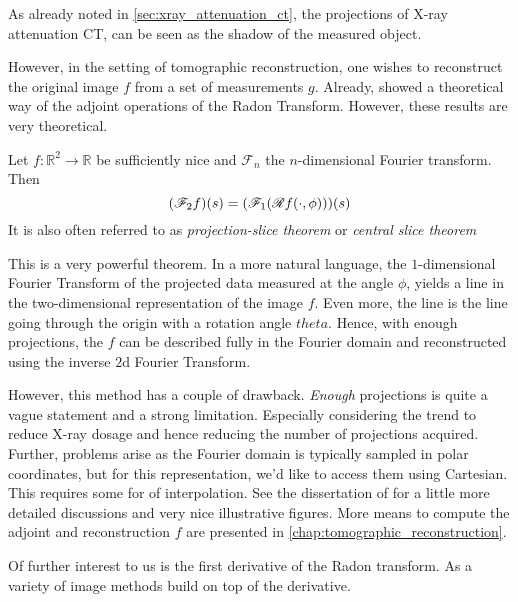 As already noted in \autoref{sec:xray_attenuation_ct}, the projections of X-ray attenuation CT, can
be seen as the shadow of the measured object.

However, in the setting of tomographic reconstruction, one wishes to reconstruct the original image
\(f\) from a set of measurements \(g\). Already, \citeauthor*{radon_uber_1917} showed a theoretical
way of the adjoint operations of the Radon Transform. However, these results are very theoretical.

\begin{definition}\label{def:fourier_slice_theorem}
	Let \(f\colon \mathbb{R}^2 \to \mathbb{R}\) be sufficiently nice and \(\mathscr{F}_n\) the
	\(n\)-dimensional Fourier transform. Then
	\[ (\mathscr{F}_2f)(s) = (\mathscr{F}_1(\mathscr{R} f(\cdot, \phi)))(s) \]
	It is also often referred to as \textit{projection-slice theorem} or \textit{central slice theorem}
\end{definition}

This is a very powerful theorem. In a more natural language, the \(1\)-dimensional Fourier Transform
of the projected data measured at the angle \(\phi\), yields a line in the two-dimensional
representation of the image \(f\). Even more, the line is the line going through the origin with a
rotation angle \(theta\). Hence, with enough projections, the \(f\) can be described fully in the
Fourier domain and reconstructed using the inverse \(2\)d Fourier Transform.


However, this method has a couple of drawback. \textit{Enough} projections is quite a vague
statement and a strong limitation. Especially considering the trend to reduce X-ray dosage and hence
reducing the number of projections acquired. Further, problems arise as the Fourier domain is
typically sampled in polar coordinates, but for this representation, we'd like to access them using
Cartesian. This requires some for of interpolation. See the dissertation of
\citeauthor{vogel_tomographic_2015}\cite[Chapter~4.1.2]{vogel_tomographic_2015} for a little more
detailed discussions and very nice illustrative figures. More means to compute the adjoint and
reconstruction \(f\) are presented in \autoref{chap:tomographic_reconstruction}.

Of further interest to us is the first derivative of the Radon transform. As a variety of image
methods build on top of the derivative.

